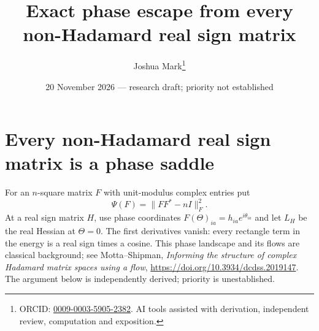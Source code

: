 \documentclass[11pt]{article}
\title{Exact phase escape from every\\non-Hadamard real sign matrix}
\author{Joshua Mark\thanks{ORCID: \href{https://orcid.org/0009-0003-5905-2382}{0009-0003-5905-2382}. AI tools assisted with derivation, independent review, computation and exposition.}}
\date{20 November 2026 --- research draft; priority not established}
\begin{document}
\maketitle
\section{Every non-Hadamard real sign matrix is a phase saddle}
For an $n$-square matrix $F$ with unit-modulus complex entries put
\[
 \Psi(F)=\|FF^*-nI\|_F^2.
\]
At a real sign matrix $H$, use phase coordinates
$F(\Theta)_{ia}=h_{ia}e^{i\theta_{ia}}$ and let $L_H$ be the real
Hessian at $\Theta=0$. The first derivatives vanish: every rectangle
term in the energy is a real sign times a cosine.
This phase landscape and its flows are classical background;
see Motta--Shipman, \emph{Informing the structure of complex Hadamard
matrix spaces using a flow},
\url{https://doi.org/10.3934/dcdss.2019147}.
The argument below is independently derived; priority is unestablished.
\end{document}

